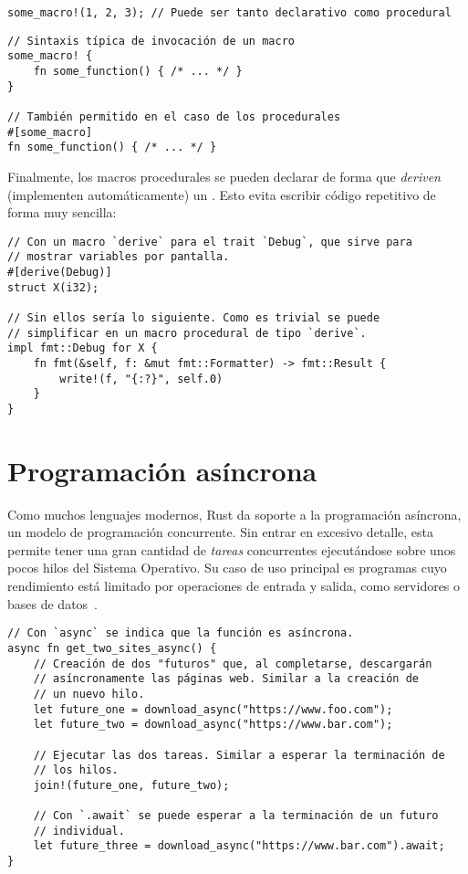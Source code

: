 \begin{verbatim}
some_macro!(1, 2, 3); // Puede ser tanto declarativo como procedural
\end{verbatim}

\begin{verbatim}
// Sintaxis típica de invocación de un macro
some_macro! {
    fn some_function() { /* ... */ }
}

// También permitido en el caso de los procedurales
#[some_macro]
fn some_function() { /* ... */ }
\end{verbatim}

Finalmente, los macros procedurales se pueden declarar de forma que
\emph{deriven} (implementen automáticamente) un \trait. Esto evita escribir
código repetitivo de forma muy sencilla:

\begin{verbatim}
// Con un macro `derive` para el trait `Debug`, que sirve para
// mostrar variables por pantalla.
#[derive(Debug)]
struct X(i32);

// Sin ellos sería lo siguiente. Como es trivial se puede
// simplificar en un macro procedural de tipo `derive`.
impl fmt::Debug for X {
    fn fmt(&self, f: &mut fmt::Formatter) -> fmt::Result {
        write!(f, "{:?}", self.0)
    }
}
\end{verbatim}

\section{Programación asíncrona}

Como muchos lenguajes modernos, Rust da soporte a la programación asíncrona, un
modelo de programación concurrente. Sin entrar en excesivo detalle, esta permite
tener una gran cantidad de \emph{tareas} concurrentes ejecutándose sobre unos
pocos hilos del Sistema Operativo. Su caso de uso principal es programas cuyo
rendimiento está limitado por operaciones de entrada y salida, como servidores o
bases de datos~\cite{rustasyncbook}.

\begin{verbatim}
// Con `async` se indica que la función es asíncrona.
async fn get_two_sites_async() {
    // Creación de dos "futuros" que, al completarse, descargarán
    // asíncronamente las páginas web. Similar a la creación de
    // un nuevo hilo.
    let future_one = download_async("https://www.foo.com");
    let future_two = download_async("https://www.bar.com");

    // Ejecutar las dos tareas. Similar a esperar la terminación de
    // los hilos.
    join!(future_one, future_two);

    // Con `.await` se puede esperar a la terminación de un futuro
    // individual.
    let future_three = download_async("https://www.bar.com").await;
}
\end{verbatim}
